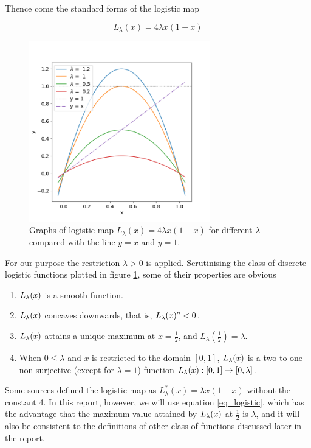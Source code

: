 Thence come the standard forms of the logistic map

\begin{equation}\label{eq_logistic}
	L_{\lambda}(x) = 4 \lambda x(1-x)
\end{equation}

\begin{figure}[t]
	\centering
	\includegraphics[width=0.7\textwidth]{./figures/logistic_map_diff_lambda.png}
	\caption{Graphs of logistic map $L_{\lambda}(x) = 4 \lambda x(1-x)$ for different $\lambda$ compared with the line $y=x$ and $y = 1$.} 
	\label{fig:logistic_map_diff_lambda}
\end{figure}


For our purpose the restriction $\lambda >0$ is applied.
Scrutinising the class of discrete logistic functions plotted in figure \ref{fig:logistic_map_diff_lambda}, some of their properties are obvious

\begin{enumerate}
	\item $L_{\lambda}(x)$ is a smooth function.
	\item $L_{\lambda}(x)$ concaves downwards, that is, $L_{\lambda}(x)'' < 0$.
	\item $L_{\lambda}(x)$ attains a unique maximum at $x = \frac{1}{2}$, and $L_{\lambda}(\frac{1}{2}) = \lambda$.
	\item When $0 \leq \lambda$ and $x$ is restricted to the domain $[0, 1]$, $L_{\lambda}(x)$ is a two-to-one non-surjective (except for $\lambda = 1$) function $L_{\lambda}(x): [0,1] \rightarrow [0,\lambda]$. 
\end{enumerate}

Some sources defined the logistic map as $L^*_{\lambda}(x) = \lambda x(1-x)$ without the constant 4. 
In this report, however, we will use equation \ref{eq_logistic}, which has the advantage that the maximum value attained by $L_{\lambda}(x)$ at $\frac{1}{2}$ is $\lambda$, and it will also be consistent to the definitions of other class of functions discussed later in the report.

